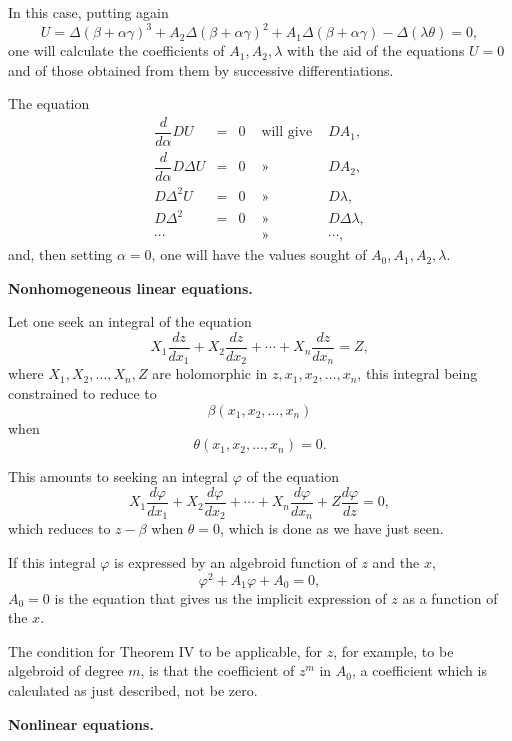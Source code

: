 \documentclass[11pt]{article}
\begin{document}
In this case, putting again
\[
U=\Delta(\beta+\alpha\gamma)^3+A_2\Delta(\beta+\alpha\gamma)^2+A_1\Delta(\beta+\alpha\gamma)-\Delta(\lambda\theta)=0,
\]
one will calculate the coefficients of $A_1,A_2,\lambda$ with the aid of the equations $U=0$ and of those obtained from them by successive differentiations.

The equation
\[
\begin{array}{rclcl}
\dfrac{d}{d\alpha}DU&=&0&\text{ will give }&DA_1,\\[0.2em]
\dfrac{d}{d\alpha}D\Delta U&=&0&\text{ » }&DA_2,\\
D\Delta^2U&=&0&\text{ » }&D\lambda,\\
D\Delta^2&=&0&\text{ » }&D\Delta\lambda,\\
\cdots&&&\text{ » }&\cdots,
\end{array}
\]
and, then setting $\alpha=0$, one will have the values sought of $A_0,A_1,A_2,\lambda$.

\begin{center}
{\bfseries Nonhomogeneous linear equations.}
\end{center}

Let one seek an integral of the equation
\[
X_1\frac{dz}{dx_1}+X_2\frac{dz}{dx_2}+\cdots+X_n\frac{dz}{dx_n}=Z,
\]
where $X_1,X_2,\ldots,X_n,Z$ are holomorphic in $z,x_1,x_2,\ldots,x_n$, this integral being constrained to reduce to
\[
\beta(x_1,x_2,\ldots,x_n)
\]
when
\[
\theta(x_1,x_2,\ldots,x_n)=0.
\]

This amounts to seeking an integral $\varphi$ of the equation
\[
X_1\frac{d\varphi}{dx_1}+X_2\frac{d\varphi}{dx_2}+\cdots+X_n\frac{d\varphi}{dx_n}
+Z\frac{d\varphi}{dz}=0,
\]
which reduces to $z-\beta$ when $\theta=0$, which is done as we have just seen.

If this integral $\varphi$ is expressed by an algebroid function of $z$ and the $x$,
\[
\varphi^2+A_1\varphi+A_0=0,
\]
$A_0=0$ is the equation that gives us the implicit expression of $z$ as a function of the $x$.

The condition for Theorem IV to be applicable, for $z$, for example, to be algebroid of degree $m$, is that the coefficient of $z^m$ in $A_0$, a coefficient which is calculated as just described, not be zero.

\begin{center}
{\bfseries Nonlinear equations.}
\end{center}
\end{document}
